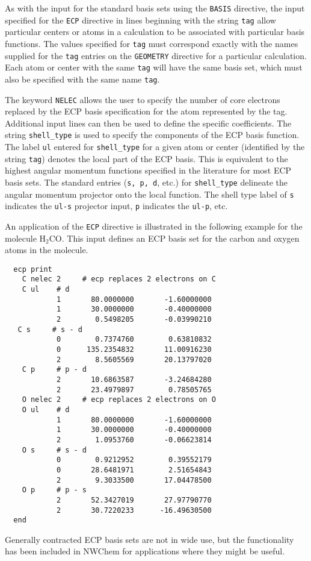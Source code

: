 As with the input for the standard basis sets using the \verb+BASIS+
directive, the input specified for the \verb+ECP+ directive in lines 
beginning with the string \verb+tag+
allow particular centers or atoms in a calculation to be associated with
particular basis functions.  The values specified for \verb+tag+
must correspond exactly with the names supplied for the \verb+tag+ entries
on the \verb+GEOMETRY+ directive for a particular calculation.  Each atom
or center with the same \verb+tag+ will have the same basis set, which must
also be specified with the same name \verb+tag+.

The keyword \verb+NELEC+ allows the user to specify the number of core 
electrons replaced by
the ECP basis specification for the atom represented by the tag.  Additional
input lines can then be used to define the specific coefficients.
The string \verb+shell_type+ is used to specify the components of the
ECP basis function.  The label \verb+ul+ entered for \verb+shell_type+
for a given atom or center (identified by the string \verb+tag+) denotes
the local part of the ECP basis.  This is equivalent to the highest 
angular momentum
functions specified in the literature for most ECP basis sets.  The
standard entries (\verb+s, p, d+, etc.) for \verb+shell_type+ delineate 
the angular momentum projector onto the local function.  The shell type 
label of \verb+s+ indicates the \verb+ul-s+ projector input, \verb+p+ 
indicates the \verb+ul-p+, etc.

An application of the \verb+ECP+ directive is illustrated in the following 
example for the molecule  H$_2$CO.  This input defines an ECP basis set 
for the  carbon and oxygen atoms in the molecule.


\begin{verbatim}
  ecp print  
    C nelec 2     # ecp replaces 2 electrons on C
    C ul    # d
            1       80.0000000       -1.60000000
            1       30.0000000       -0.40000000
            2        0.5498205       -0.03990210
   C s     # s - d 
            0        0.7374760        0.63810832
            0      135.2354832       11.00916230
            2        8.5605569       20.13797020
    C p     # p - d
            2       10.6863587       -3.24684280
            2       23.4979897        0.78505765
    O nelec 2     # ecp replaces 2 electrons on O
    O ul    # d 
            1       80.0000000       -1.60000000
            1       30.0000000       -0.40000000
            2        1.0953760       -0.06623814
    O s     # s - d
            0        0.9212952        0.39552179
            0       28.6481971        2.51654843
            2        9.3033500       17.04478500
    O p     # p - s 
            2       52.3427019       27.97790770
            2       30.7220233      -16.49630500
  end
\end{verbatim}

Generally contracted ECP basis sets are not in wide use, but the
functionality has been included in NWChem for applications where they
might be useful. 

